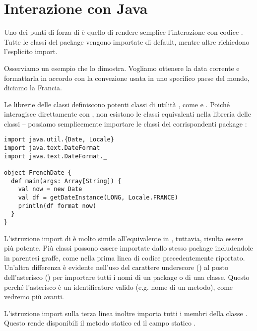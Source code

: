 \section{Interazione con Java}
\label{sec:inter-with-java}

Uno dei punti di forza di \Scala \`e quello di rendere semplice l'interazione con codice \Java. Tutte le classi del package  vengono importate di default, mentre altre richiedono l'esplicito import.

Osserviamo un esempio che lo dimostra. Vogliamo ottenere la data corrente e formattarla in accordo con la convezione usata in uno specifico paese del mondo, diciamo la Francia. %

Le librerie delle classi \Java definiscono potenti classi di utilit\`a  , come  e 
\newline 
{}. Poich\'e \Scala interagisce direttamente con \Java, non esistono le classi equivalenti nella libreria delle classi \Scala -- possiamo semplicemente importare le classi dei corrispondenti package \Java:
\begin{lstlisting}
import java.util.{Date, Locale}
import java.text.DateFormat
import java.text.DateFormat._

object FrenchDate {
  def main(args: Array[String]) {
    val now = new Date
    val df = getDateInstance(LONG, Locale.FRANCE)
    println(df format now)
  }
}
\end{lstlisting}
L'istruzione import di \Scala \`e molto simile all'equivalente in \Java, tuttavia, risulta essere pi\`u potente. Pi\`u classi possono essere importate dallo stesso package includendole in parentesi graffe, come nella prima linea di codice precedentemente riportato. Un'altra differenza \`e evidente nell'uso del carattere underscore (\code{_}) al posto dell'asterisco (\code{*}) per importare tutti i nomi di un package o di una classe. Questo perch\'e l'asterisco \`e un identificatore \Scala valido (e.g. nome di un metodo), come vedremo pi\`u avanti.

L'istruzione import sulla terza linea inoltre importa tutti i membri della classe 
\newline
{}. Questo rende disponibili il metodo statico  ed il campo statico .

